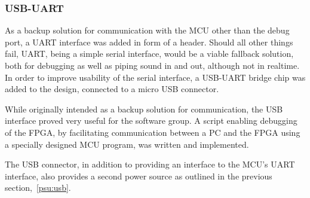 
\subsubsection{USB-UART}

As a backup solution for communication with the MCU other than the debug port,
a UART interface was added in form of a header. Should all other things fail,
UART, being a simple serial interface, would be a viable fallback solution, both
for debugging as well as piping sound in and out, although not in realtime. In
order to improve usability of the serial interface, a USB-UART bridge chip was
added to the design, connected to a micro USB connector.

While originally intended as a backup solution for communication, the USB
interface proved very useful for the software group. A script enabling debugging
of the FPGA, by facilitating communication between a PC and the FPGA using a
specially designed MCU program, was written and implemented. 

The USB connector, in addition to providing an interface to the MCU's UART
interface, also provides a second power source as outlined in
the previous section,~\ref{psu:usb}.
